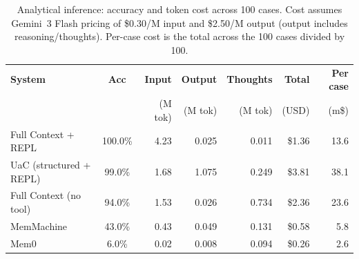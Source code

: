 \begin{table}[!ht]
\centering
\caption{Analytical inference: accuracy and token cost across 100 cases. Cost assumes Gemini~3 Flash pricing of \$0.30/M input and \$2.50/M output (output includes reasoning/thoughts). Per-case cost is the total across the 100 cases divided by 100.}
\label{tab:analytical-cost}
\small
\begin{tabular}{@{}lcrrrrr@{}}
\toprule
\textbf{System} & \textbf{Acc} & \textbf{Input} & \textbf{Output} & \textbf{Thoughts} & \textbf{Total} & \textbf{Per case} \\
 & & (M tok) & (M tok) & (M tok) & (USD) & (m\$) \\
\midrule
Full Context + REPL & 100.0\% & 4.23 & 0.025 & 0.011 & \$1.36 & 13.6 \\
UaC (structured + REPL) & 99.0\% & 1.68 & 1.075 & 0.249 & \$3.81 & 38.1 \\
Full Context (no tool) & 94.0\% & 1.53 & 0.026 & 0.734 & \$2.36 & 23.6 \\
MemMachine & 43.0\% & 0.43 & 0.049 & 0.131 & \$0.58 & 5.8 \\
Mem0 & 6.0\% & 0.02 & 0.008 & 0.094 & \$0.26 & 2.6 \\
\bottomrule
\end{tabular}
\end{table}
